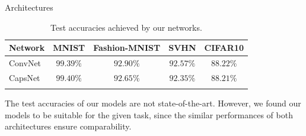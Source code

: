 \documentclass[final]{beamer}
\newlength{\onecolwid}
\newlength{\twocolwid}
\begin{document}
\begin{frame}[t]
\begin{columns}[t]
\begin{column}{\twocolwid}
\begin{columns}[t,totalwidth=\twocolwid]
\begin{column}{\onecolwid}
\begin{block}{Architectures}
						\begin{table}[h]
							\centering\small{
								\begin{tabular}{lcccc}
									\toprule
									Network       & MNIST & Fashion-MNIST & SVHN & CIFAR10  \\
									\midrule
									ConvNet           & $99.39\%$ & $92.90\%$ & $92.57\%$ & $88.22\%$ \\
									CapsNet           & $99.40\%$ & $92.65\%$ & $92.35\%$ & $88.21\%$ \\
									\bottomrule\\
							\end{tabular}}
							\caption{\phantom{T}Test accuracies achieved by our networks.}
						\end{table}
						
						The test accuracies of our models are not state-of-the-art. However, we found our models to be suitable for the given task, since the similar performances of both architectures ensure comparability. 
						
					\end{block}
					

\end{column}
\end{columns}
\end{column}
\end{columns}
\end{frame}
\end{document}

